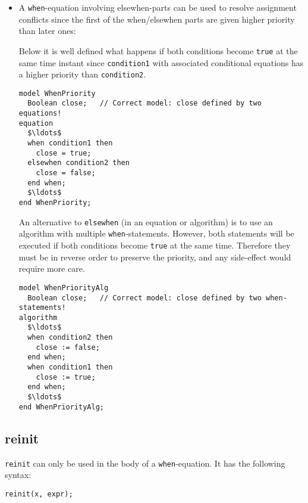 \begin{itemize}
\item
  A \lstinline!when!-equation involving elsewhen-parts can be used to resolve assignment conflicts since the first of the when/elsewhen parts are given higher priority than later ones:
\begin{nonnormative}
Below it is well defined what happens if both conditions become \lstinline!true! at the same time instant since \lstinline!condition1! with associated conditional equations has a higher priority than \lstinline!condition2!.
\begin{lstlisting}[language=modelica]
model WhenPriority
  Boolean close;   // Correct model: close defined by two equations!
equation
  $\ldots$
  when condition1 then
    close = true;
  elsewhen condition2 then
    close = false;
  end when;
  $\ldots$
end WhenPriority;
\end{lstlisting}
An alternative to \lstinline!elsewhen! (in an equation or algorithm) is to use an algorithm with multiple \lstinline!when!-statements.
However, both statements will be executed if both conditions become \lstinline!true! at the same time.
Therefore they must be in reverse order to preserve the priority, and any side-effect would require more care.
\begin{lstlisting}[language=modelica]
model WhenPriorityAlg
  Boolean close;   // Correct model: close defined by two when-statements!
algorithm
  $\ldots$
  when condition2 then
    close := false;
  end when;
  when condition1 then
    close := true;
  end when;
  $\ldots$
end WhenPriorityAlg;
\end{lstlisting}
\end{nonnormative}
\end{itemize}

\subsection{reinit}\label{reinit}

\lstinline!reinit! can only be used in the body of a \lstinline!when!-equation.
It has the following syntax:
\begin{lstlisting}[language=modelica]
reinit(x, expr);
\end{lstlisting}

